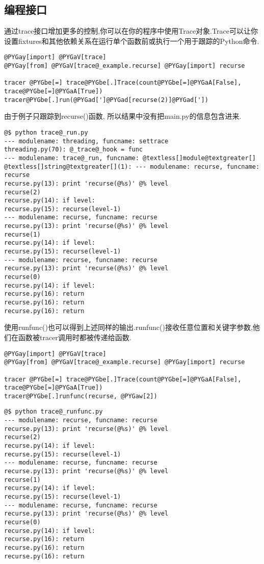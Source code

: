 \documentclass[a4paper,10pt,english]{manual}
\begin{document}
\subsection{编程接口}

通过trace接口增加更多的控制,你可以在你的程序中使用Trace对象.Trace可以让你设置fixtures和其他依赖关系在运行单个函数前或执行一个用于跟踪的Python命令.

\begin{Verbatim}[commandchars=@\[\]]
@PYGay[import] @PYGaV[trace]
@PYGay[from] @PYGaV[trace@_example.recurse] @PYGay[import] recurse

tracer @PYGbe[=] trace@PYGbe[.]Trace(count@PYGbe[=]@PYGaA[False], trace@PYGbe[=]@PYGaA[True])
tracer@PYGbe[.]run(@PYGad[']@PYGad[recurse(2)]@PYGad['])
\end{Verbatim}

由于例子只跟踪到recurse()函数, 所以结果中没有把main.py的信息包含进来.

\begin{Verbatim}[commandchars=@\[\]]
@$ python trace@_run.py
--- modulename: threading, funcname: settrace
threading.py(70): @_trace@_hook = func
--- modulename: trace@_run, funcname: @textless[]module@textgreater[]
@textless[]string@textgreater[](1): --- modulename: recurse, funcname: recurse
recurse.py(13): print 'recurse(@%s)' @% level
recurse(2)
recurse.py(14): if level:
recurse.py(15): recurse(level-1)
--- modulename: recurse, funcname: recurse
recurse.py(13): print 'recurse(@%s)' @% level
recurse(1)
recurse.py(14): if level:
recurse.py(15): recurse(level-1)
--- modulename: recurse, funcname: recurse
recurse.py(13): print 'recurse(@%s)' @% level
recurse(0)
recurse.py(14): if level:
recurse.py(16): return
recurse.py(16): return
recurse.py(16): return
\end{Verbatim}

使用runfunc()也可以得到上述同样的输出.runfunc()接收任意位置和关键字参数,他们在函数被tracer调用时都被传递给函数.

\begin{Verbatim}[commandchars=@\[\]]
@PYGay[import] @PYGaV[trace]
@PYGay[from] @PYGaV[trace@_example.recurse] @PYGay[import] recurse

tracer @PYGbe[=] trace@PYGbe[.]Trace(count@PYGbe[=]@PYGaA[False], trace@PYGbe[=]@PYGaA[True])
tracer@PYGbe[.]runfunc(recurse, @PYGaw[2])
\end{Verbatim}

\begin{Verbatim}[commandchars=@\[\]]
@$ python trace@_runfunc.py
--- modulename: recurse, funcname: recurse
recurse.py(13): print 'recurse(@%s)' @% level
recurse(2)
recurse.py(14): if level:
recurse.py(15): recurse(level-1)
--- modulename: recurse, funcname: recurse
recurse.py(13): print 'recurse(@%s)' @% level
recurse(1)
recurse.py(14): if level:
recurse.py(15): recurse(level-1)
--- modulename: recurse, funcname: recurse
recurse.py(13): print 'recurse(@%s)' @% level
recurse(0)
recurse.py(14): if level:
recurse.py(16): return
recurse.py(16): return
recurse.py(16): return
\end{Verbatim}
\end{document}
